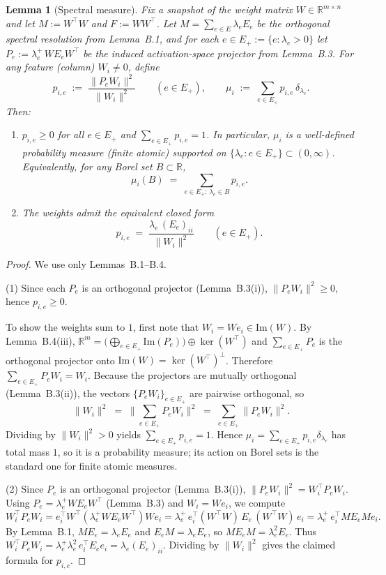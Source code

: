 \documentclass{article}
\theoremstyle{plain}
\newtheorem{lemma}{Lemma}[section]
\numberwithin{equation}{section}
\theoremstyle{definition}
\theoremstyle{remark}
\begin{document}
\begin{lemmaproofbox}
    \begin{lemma}[Spectral measure]\label{lemma:spectral_measure_probability_distribution}
Fix a snapshot of the weight matrix $W\in\mathbb{R}^{m\times n}$ and let
$M := W^\top W$ and $F := WW^\top$.
Let $M=\sum_{e\in E}\lambda_e E_e$ be the orthogonal spectral resolution from Lemma~B.1, and for each $e\in E_+:=\{e:\lambda_e>0\}$
let $P_e := \lambda_e^{+}\, W E_e W^\top$ be the induced activation-space projector from Lemma~B.3.
For any feature (column) $W_i\neq 0$, define
\[
p_{i,e} \;:=\; \frac{\|P_e W_i\|^2}{\|W_i\|^2}\qquad (e\in E_+),
\qquad
\mu_i \;:=\; \sum_{e\in E_+} p_{i,e}\,\delta_{\lambda_e}.
\]
Then:
\begin{enumerate}
\item $p_{i,e}\ge 0$ for all $e\in E_+$ and $\sum_{e\in E_+} p_{i,e}=1$.
In particular, $\mu_i$ is a well-defined probability measure (finite atomic) supported on $\{\lambda_e:e\in E_+\}\subset(0,\infty)$.
Equivalently, for any Borel set $B\subset\mathbb{R}$,
\[
\mu_i(B) \;=\; \sum_{e\in E_+:\,\lambda_e\in B} p_{i,e}.
\]
\item The weights admit the equivalent closed form
\[
p_{i,e} \;=\; \frac{\lambda_e\,(E_e)_{ii}}{\|W_i\|^2}\qquad (e\in E_+).
\]
\end{enumerate}
\end{lemma}
\begin{proof}
We use only Lemmas~B.1--B.4.

(1) Since each $P_e$ is an orthogonal projector (Lemma~B.3(i)), $\|P_eW_i\|^2\ge 0$, hence $p_{i,e}\ge 0$.

To show the weights sum to $1$, first note that $W_i = W e_i\in\mathrm{Im}(W)$.
By Lemma~B.4(iii), $\mathbb{R}^m = \big(\bigoplus_{e\in E_+}\mathrm{Im}(P_e)\big)\oplus \ker(W^\top)$ and $\sum_{e\in E_+}P_e$ is the orthogonal projector onto $\mathrm{Im}(W)=\ker(W^\top)^\perp$.
Therefore $\sum_{e\in E_+}P_e W_i = W_i$.
Because the projectors are mutually orthogonal (Lemma~B.3(ii)), the vectors $\{P_eW_i\}_{e\in E_+}$ are pairwise orthogonal, so
\[
\|W_i\|^2 \;=\; \Big\|\sum_{e\in E_+}P_eW_i\Big\|^2
\;=\; \sum_{e\in E_+}\|P_eW_i\|^2.
\]
Dividing by $\|W_i\|^2>0$ yields $\sum_{e\in E_+}p_{i,e}=1$.
Hence $\mu_i=\sum_{e\in E_+}p_{i,e}\delta_{\lambda_e}$ has total mass $1$, so it is a probability measure; its action on Borel sets is the standard one for finite atomic measures.

(2) Since $P_e$ is an orthogonal projector (Lemma~B.3(i)), $\|P_eW_i\|^2 = W_i^\top P_e W_i$.
Using $P_e=\lambda_e^{+}WE_eW^\top$ (Lemma~B.3) and $W_i=We_i$, we compute
\[
W_i^\top P_e W_i
= e_i^\top W^\top(\lambda_e^{+}WE_eW^\top)We_i
= \lambda_e^{+}\, e_i^\top (W^\top W)\,E_e\,(W^\top W)\, e_i
= \lambda_e^{+}\, e_i^\top M E_e M e_i.
\]
By Lemma~B.1, $ME_e=\lambda_eE_e$ and $E_eM=\lambda_eE_e$, so $ME_eM=\lambda_e^2E_e$.
Thus $W_i^\top P_e W_i = \lambda_e^{+}\lambda_e^2\, e_i^\top E_e e_i = \lambda_e (E_e)_{ii}$.
Dividing by $\|W_i\|^2$ gives the claimed formula for $p_{i,e}$.
\qedhere
\end{proof}
\end{lemmaproofbox}
\end{document}

